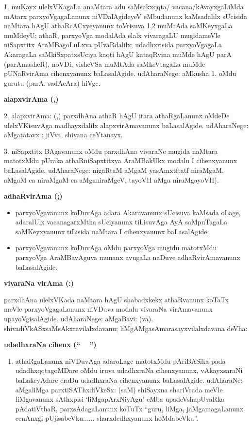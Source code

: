 1. muKayx ulelxVKagaLa anaMtara adu saMsakxqqta/ vacana/kAvayxgaLiMda mAtarx parxyoVgagaLanunx niVDalAgideyeV eMbudanunx kaMsadalilx sUcisida naMtara hAgU athaRcACxyeyanunx toVrisuva 1,2 muMtAda saMKeyxgaLa muMdeyU; athaR, parxyoVga modalAda elalx vivaragaLU mugidameVle niSapxtitx AraMBagoLuLxva pUvaRdalilx; udadhxrisida parxyoVgagaLa AkaragaLa saMkiSxpatxsUciya kaqti hAgU kataqRvina muMde hAgU parA (parAmasheR), noVDi, visheVSa muMtAda saMkeVtagaLa muMde pUNaRvirAma cihenx\-yanunx baLasalAgide. udAharaNege: aMkusha 1. oMdu gurutu (parA. sadAcAra) hiVge.

\smallskip
\begin{center}
\textbf{alapxvirAma (,)}
\end{center}
\smallskip

2. alapxvirAma: (,) parxdhAna athaR hAgU itara athaRgaLanunx oMdeDe ulelxVKisuvAga  madhayxdalilx alapxvirAmavanunx baLasalAgide. udAharaNege: aMgatatavx : jiVva, shivana ceYtanayx.

3. niSapxtitx BAgavanunx oMdu parxdhAna vivaraNe mugida naMtara matotxMdu pUraka athaRniSapxtitxya AraMBakUkx modalu I cihenxyanunx baLasalAgide. udAharaNege: nigaRtaM aMgaM yasAmxtftatf niraMgaM, aMgaM ca niraMgaM ca aMganiraMgeV, tayoVH aMga niraMgayoVH).

\smallskip
\begin{center}
\textbf{adhaRvirAma (;)}
\end{center}
\begin{itemize}
\item parxyoVgavanunx koDuvAga adara Akaravanunx sUcisuva kaMsada oLage, adaralUlx vacanagarxMtha sUciyanunx tiLisuvAga AyA saMpuTagaLa saMKeyxyanunx tiLisida naMtara I cihenxyanunx baLasalAgide.

\item parxyoVgavanunx koDuvAga oMdu parxyoVga mugidu matotxMdu parxyoVga AraMBavAguva munanx avugaLa naDuve adhaR\-virAmavanunx baLasalAgide.
\end{itemize}

\begin{center}
\textbf{vivaraNa virAma (:)}
\end{center}
\smallskip

\noindent
parxdhAna ulelxVKada naMtara hAgU shabadxkekx athaRvanunx koTaTx meVle parxyoVgagaLanunx niVDuva modalu vivaraNa virAmavanunx upa\-yoVgisalAgide. udAharaNege: aMgaBavi: (va). shivadiVkASxsaMsAkxravilalxdavanu; liMgAMgasAmarasayxvilalxdavana deVha:

\smallskip
\begin{center}
\textbf{udadhxraNa cihenx (`` ~ '')}
\end{center}
\begin{enumerate}
\item athaRgaLanunx niVDuvAga adaroLage matotxMdu pAriBASika pada udadhxqqtagoMDare oMdu iruva udadhxraNa cihenxyanunx, vAkayxsaraNi baLakeyAdare eraDu udadhxraNa cihenxyanunx baLasalAgide. udAharaNe: aMgaliMga parxtiSAThxdiVkeSx: (saM) shiSayxna shariVrada meVle liMgavanunx sAthxpisi `liMgapArxNiyAgu' eMba upadeVshapUvaRka pAdatiVthaR, parxsAdagaLanunx koTuTx ``guru, liMga, jaMgamagaLanunx cenAnxgi pUjisabeVku...... sharxdedhxyanunx hoMdabeVku''.
\end{enumerate}


